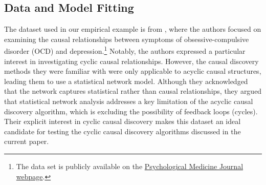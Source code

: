 \documentclass[twoside, 11pt]{article}
\begin{document}

\subsection{Data and Model Fitting}
The dataset used in our empirical example is from \cite{mcnally_co-morbid_2017}, where the authors focused on examining the causal relationships between symptoms of obsessive-compulsive disorder (OCD) and depression.\footnote{The data set is publicly available on the \href{https://www.cambridge.org/core/journals/psychological-medicine/article/abs/comorbid-obsessivecompulsive-disorder-and-depression-a-bayesian-network-approach/DAA4E2352A9E26809A4EAE35C366E900\#supplementary-materials}{Psychological Medicine Journal webpage}.} Notably, the authors expressed a particular interest in investigating cyclic causal relationships. However, the causal discovery methods they were familiar with were only applicable to acyclic causal structures, leading them to use a statistical network model. Although they acknowledged that the network captures statistical rather than causal relationships, they argued that statistical network analysis addresses a key limitation of the acyclic causal discovery algorithm, which is excluding the possibility of feedback loops (cycles). Their explicit interest in cyclic causal discovery makes this dataset an ideal candidate for testing the cyclic causal discovery algorithms discussed in the current paper.
\end{document}
